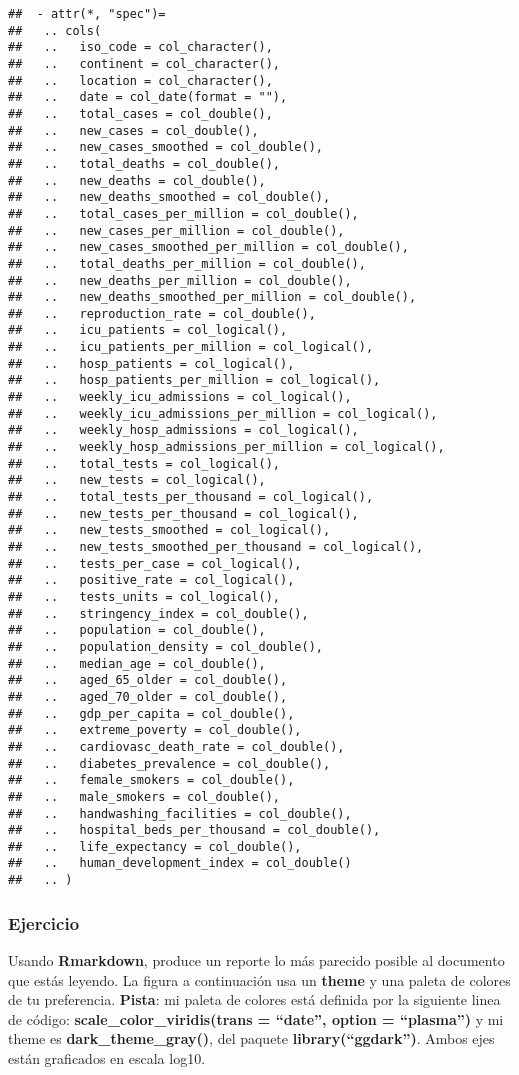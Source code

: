 \documentclass[
]{article}
\begin{document}
\begin{verbatim}
##  - attr(*, "spec")=
##   .. cols(
##   ..   iso_code = col_character(),
##   ..   continent = col_character(),
##   ..   location = col_character(),
##   ..   date = col_date(format = ""),
##   ..   total_cases = col_double(),
##   ..   new_cases = col_double(),
##   ..   new_cases_smoothed = col_double(),
##   ..   total_deaths = col_double(),
##   ..   new_deaths = col_double(),
##   ..   new_deaths_smoothed = col_double(),
##   ..   total_cases_per_million = col_double(),
##   ..   new_cases_per_million = col_double(),
##   ..   new_cases_smoothed_per_million = col_double(),
##   ..   total_deaths_per_million = col_double(),
##   ..   new_deaths_per_million = col_double(),
##   ..   new_deaths_smoothed_per_million = col_double(),
##   ..   reproduction_rate = col_double(),
##   ..   icu_patients = col_logical(),
##   ..   icu_patients_per_million = col_logical(),
##   ..   hosp_patients = col_logical(),
##   ..   hosp_patients_per_million = col_logical(),
##   ..   weekly_icu_admissions = col_logical(),
##   ..   weekly_icu_admissions_per_million = col_logical(),
##   ..   weekly_hosp_admissions = col_logical(),
##   ..   weekly_hosp_admissions_per_million = col_logical(),
##   ..   total_tests = col_logical(),
##   ..   new_tests = col_logical(),
##   ..   total_tests_per_thousand = col_logical(),
##   ..   new_tests_per_thousand = col_logical(),
##   ..   new_tests_smoothed = col_logical(),
##   ..   new_tests_smoothed_per_thousand = col_logical(),
##   ..   tests_per_case = col_logical(),
##   ..   positive_rate = col_logical(),
##   ..   tests_units = col_logical(),
##   ..   stringency_index = col_double(),
##   ..   population = col_double(),
##   ..   population_density = col_double(),
##   ..   median_age = col_double(),
##   ..   aged_65_older = col_double(),
##   ..   aged_70_older = col_double(),
##   ..   gdp_per_capita = col_double(),
##   ..   extreme_poverty = col_double(),
##   ..   cardiovasc_death_rate = col_double(),
##   ..   diabetes_prevalence = col_double(),
##   ..   female_smokers = col_double(),
##   ..   male_smokers = col_double(),
##   ..   handwashing_facilities = col_double(),
##   ..   hospital_beds_per_thousand = col_double(),
##   ..   life_expectancy = col_double(),
##   ..   human_development_index = col_double()
##   .. )
\end{verbatim}

\hypertarget{ejercicio}{%
\subsubsection{Ejercicio}\label{ejercicio}}

Usando \textbf{Rmarkdown}, produce un reporte lo más parecido posible al
documento que estás leyendo. La figura a continuación usa un
\textbf{theme} y una paleta de colores de tu preferencia.
\textbf{Pista}: mi paleta de colores está definida por la siguiente
linea de código: \textbf{scale\_color\_viridis(trans = ``date'', option
= ``plasma'')} y mi theme es \textbf{dark\_theme\_gray()}, del paquete
\textbf{library(``ggdark'')}. Ambos ejes están graficados en escala
log10.
\end{document}
